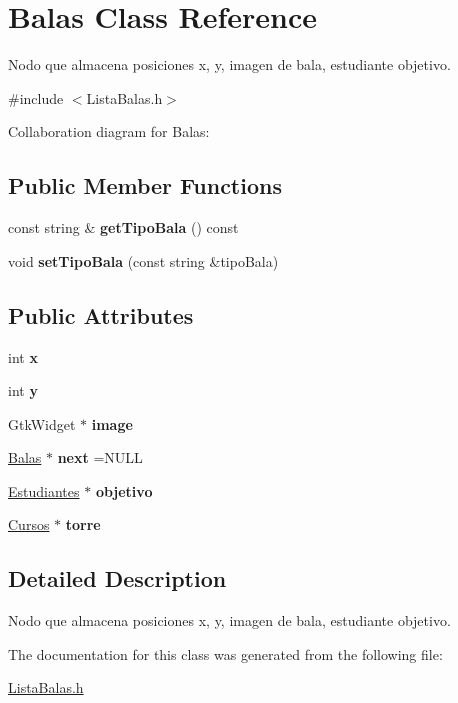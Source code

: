 \hypertarget{classBalas}{}\section{Balas Class Reference}
\label{classBalas}


Nodo que almacena posiciones x, y, imagen de bala, estudiante objetivo.  




{\ttfamily \#include $<$Lista\+Balas.\+h$>$}



Collaboration diagram for Balas\+:
\subsection*{Public Member Functions}
\begin{DoxyCompactItemize}
\item 
\mbox{\label{classBalas_a12bf0e344ef46fad5909db0d8a50c601}} 
const string \& {\bfseries get\+Tipo\+Bala} () const
\item 
\mbox{\label{classBalas_a495992579a5d1997781ddaae04f2c695}} 
void {\bfseries set\+Tipo\+Bala} (const string \&tipo\+Bala)
\end{DoxyCompactItemize}
\subsection*{Public Attributes}
\begin{DoxyCompactItemize}
\item 
\mbox{\label{classBalas_a6b42fe246e34988b46982f60ac49599a}} 
int {\bfseries x}
\item 
\mbox{\label{classBalas_a4c625863840748c71f9c387c715aebae}} 
int {\bfseries y}
\item 
\mbox{\label{classBalas_a05513290bb84c0a8823c2ab0e546e61f}} 
Gtk\+Widget $\ast$ {\bfseries image}
\item 
\mbox{\label{classBalas_a55211325394c428ea98d15a8a5da4e9b}} 
\hyperlink{classBalas}{Balas} $\ast$ {\bfseries next} =N\+U\+LL
\item 
\mbox{\label{classBalas_ae9657845c6cc1389e4a65381874f7b88}} 
\hyperlink{classEstudiantes}{Estudiantes} $\ast$ {\bfseries objetivo}
\item 
\mbox{\label{classBalas_acbd72bb86f830fa332dbfa5a8175071b}} 
\hyperlink{classCursos}{Cursos} $\ast$ {\bfseries torre}
\end{DoxyCompactItemize}


\subsection{Detailed Description}
Nodo que almacena posiciones x, y, imagen de bala, estudiante objetivo. 

The documentation for this class was generated from the following file\+:\begin{DoxyCompactItemize}
\item 
\hyperlink{ListaBalas_8h}{Lista\+Balas.\+h}\end{DoxyCompactItemize}

